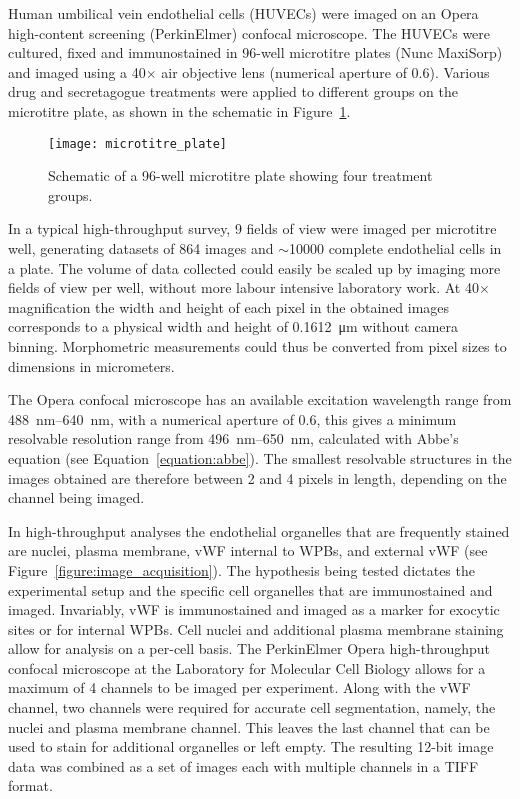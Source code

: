 Human umbilical vein endothelial cells (HUVECs) were imaged on an Opera high-content screening (PerkinElmer) confocal microscope. The HUVECs were cultured, fixed and immunostained in 96-well microtitre plates  (Nunc MaxiSorp) and imaged using a 40$\times$ air objective lens (numerical aperture of 0.6). Various drug and secretagogue treatments were applied to different groups on the microtitre plate, as shown in the schematic in Figure~\ref{figure:endothelial_morphometry:image_acquisition:microtitre_plate}.

\begin{figure}[htbp!]
	\centering
	\texttt{[image: microtitre\_plate]}
	\caption[Microtitre plate layout]{Schematic of a 96-well microtitre plate showing four treatment groups.}
	\label{figure:endothelial_morphometry:image_acquisition:microtitre_plate}
\end{figure}

In a typical high-throughput survey, 9 fields of view were imaged per microtitre well, generating datasets of 864 images and $\sim$10000 complete endothelial cells in a plate. The volume of data collected could easily be scaled up by imaging more fields of view per well, without more labour intensive laboratory work. At 40$\times$ magnification the width and height of each pixel in the obtained images corresponds to a physical width and height of \SI{0.1612}{\micro\meter} without camera binning. Morphometric measurements could thus be converted from pixel sizes to dimensions in micrometers.

The Opera confocal microscope has an available excitation wavelength range from \SIrange{488}{640}{\nano\meter}, with a numerical aperture of 0.6, this gives a minimum resolvable resolution range from \SIrange{496}{650}{\nano\meter}, calculated with Abbe's equation (see Equation~\ref{equation:abbe}). The smallest resolvable structures in the images obtained are therefore between 2 and 4 pixels in length, depending on the channel being imaged.

In high-throughput analyses the endothelial organelles that are frequently stained are nuclei, plasma membrane, vWF internal to WPBs, and external vWF (see Figure~\ref{figure:image_acquisition}). The hypothesis being tested dictates the experimental setup and the specific cell organelles that are immunostained and imaged. Invariably, vWF is immunostained and imaged as a marker for exocytic sites or for internal WPBs. Cell nuclei and additional plasma membrane staining allow for analysis on a per-cell basis. The PerkinElmer Opera high-throughput confocal microscope at the Laboratory for Molecular Cell Biology allows for a maximum of 4 channels to be imaged per experiment. Along with the vWF channel, two channels were required for accurate cell segmentation, namely, the nuclei and plasma membrane channel. This leaves the last channel that can be used to stain for additional organelles or left empty. The resulting 12-bit image data was combined as a set of images each with multiple channels in a TIFF format.

